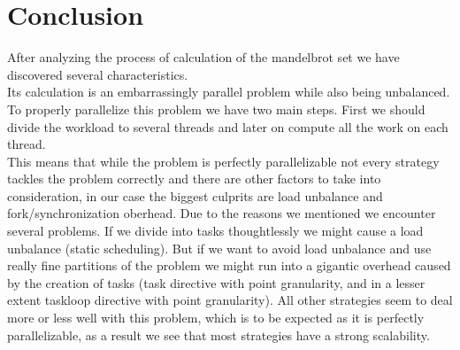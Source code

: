 \documentclass[11pt]{article}
\begin{document}
\section{Conclusion}
After analyzing the process of calculation of the mandelbrot set we have discovered several characteristics. \\
Its calculation is an embarrassingly parallel problem while also being unbalanced. To properly parallelize this problem we have two main steps. First we should divide the workload to several threads and later on compute all the work on each thread. \\
This means that while the problem is perfectly parallelizable not every strategy tackles the problem correctly and there are other factors to take into consideration, in our case the biggest culprits are load unbalance and fork/synchronization oberhead.
Due to the reasons we mentioned we encounter several problems. If we divide into tasks thoughtlessly we might cause a load unbalance (static scheduling). But if we want to avoid load unbalance and use really fine partitions of the problem we might run into a gigantic overhead caused by the creation of tasks (task directive with point granularity, and in a lesser extent taskloop directive with point granularity). All other strategies seem to deal more or less well with this problem, which is to be expected as it is perfectly parallelizable, as a result we see that most strategies have a strong scalability.
\end{document}
